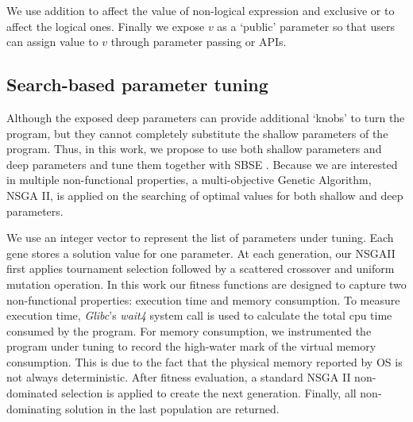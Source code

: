 We use addition to affect the value of non-logical expression and exclusive or to affect the logical ones.
Finally we expose $v$ as a `public' parameter so that users can assign value to $v$ through parameter passing or APIs.

\subsection{Search-based parameter tuning}
\label{sec_nsgaii}

Although the exposed deep parameters can provide additional `knobs' to turn the program, but they cannot completely substitute the shallow parameters of the program.  Thus, in this work, we propose to use both shallow parameters and deep parameters and tune them together with SBSE \cite{Harman:2007:CSF:1253532.1254729}. Because we are interested in multiple non-functional properties, a multi-objective Genetic Algorithm, NSGA II\cite{996017}, is applied on the searching of optimal values for both shallow and deep parameters.


We use an integer vector to represent the list of parameters under tuning. Each gene stores a solution value for one parameter. At each generation, our NSGAII first applies tournament selection followed by a scattered crossover and uniform mutation operation. In this work our fitness functions are designed to capture two non-functional properties: execution time and memory consumption. To measure execution time, \emph{Glibc}'s \emph{wait4} system call is used to calculate the total cpu time consumed by the program. For memory consumption, we instrumented the program under tuning to record the high-water mark of the virtual memory consumption. This is due to the fact that the physical memory reported by OS is not always deterministic. After fitness evaluation, a standard NSGA II non-dominated selection is applied to create the next generation. Finally, all non-dominating solution in the last population are returned.

